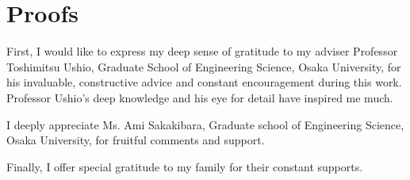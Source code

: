 \documentclass[a4j,12pt,oneside,openany,english,dvipdfmx]{jsbook}
\begin{document}
\chapter{Proofs}






\begin{acknowledgement}
	First, I would like to express my deep sense of gratitude to my adviser Professor
	Toshimitsu Ushio, Graduate School of Engineering Science, Osaka University,
	for his invaluable, constructive advice and constant encouragement during this work.
	Professor Ushio's deep knowledge and his eye for detail have inspired me much.

  I deeply appreciate Ms. Ami Sakakibara, Graduate school of Engineering Science, Osaka University, for fruitful comments and support.

  Finally, I offer special gratitude to my family for their constant supports.
\end{acknowledgement}
\end{document}
